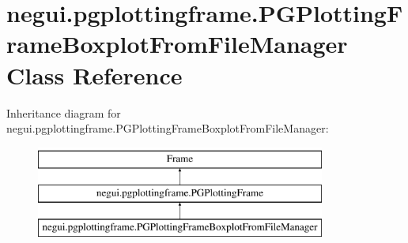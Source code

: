 \hypertarget{classnegui_1_1pgplottingframe_1_1PGPlottingFrameBoxplotFromFileManager}{}\section{negui.\+pgplottingframe.\+P\+G\+Plotting\+Frame\+Boxplot\+From\+File\+Manager Class Reference}
\label{classnegui_1_1pgplottingframe_1_1PGPlottingFrameBoxplotFromFileManager}
Inheritance diagram for negui.\+pgplottingframe.\+P\+G\+Plotting\+Frame\+Boxplot\+From\+File\+Manager\+:\begin{figure}[H]
\begin{center}
\leavevmode
\includegraphics[height=3.000000cm]{classnegui_1_1pgplottingframe_1_1PGPlottingFrameBoxplotFromFileManager}
\end{center}
\end{figure}
